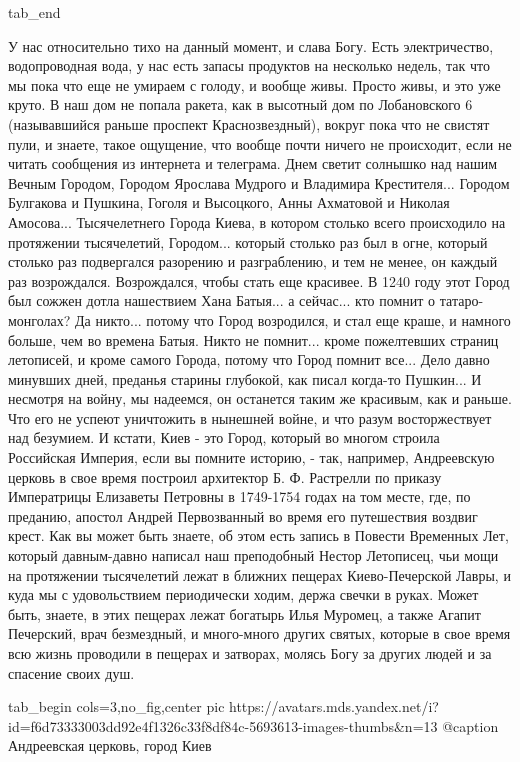   tab_end
\fi

У нас относительно тихо на данный момент,
и слава Богу. Есть электричество, водопроводная вода, у нас есть запасы
продуктов на несколько недель, так что мы пока что еще не умираем с голоду, и
вообще живы. Просто живы, и это уже круто.  В наш дом не попала ракета, как в
высотный дом по Лобановского 6 (называвшийся раньше проспект Краснозвездный),
вокруг пока что не свистят пули, и знаете, такое ощущение, что вообще почти
ничего не происходит, если не читать сообщения из интернета и телеграма.  Днем
светит солнышко над нашим Вечным Городом, Городом Ярослава Мудрого и Владимира
Крестителя... Городом Булгакова и Пушкина, Гоголя и Высоцкого, Анны Ахматовой и
Николая Амосова...  Тысячелетнего Города Киева, в котором столько всего
происходило на протяжении тысячелетий, Городом... который столько раз был в
огне, который столько раз подвергался разорению и разграблению, и тем не менее,
он каждый раз возрождался.  Возрождался, чтобы стать еще красивее. В 1240 году
этот Город был сожжен дотла нашествием Хана Батыя... а сейчас... кто помнит о
татаро-монголах?  Да никто...  потому что Город возродился, и стал еще краше, и
намного больше, чем во времена Батыя.  Никто не помнит... кроме пожелтевших
страниц летописей, и кроме самого Города, потому что Город помнит все... Дело
давно минувших дней, преданья старины глубокой, как писал когда-то Пушкин... И
несмотря на войну, мы надеемся, он останется таким же красивым, как и раньше.
Что его не успеют уничтожить в нынешней войне, и что разум восторжествует над
безумием.  И кстати, Киев - это Город, который во многом строила Российская
Империя, если вы помните историю, - так, например, Андреевскую церковь в свое
время построил архитектор Б. Ф.  Растрелли по приказу Императрицы Елизаветы
Петровны в 1749-1754 годах на том месте, где, по преданию, апостол Андрей
Первозванный во время его путешествия воздвиг крест. Как вы может быть знаете,
об этом есть запись в Повести Временных Лет, который давным-давно написал наш
преподобный Нестор Летописец, чьи мощи на протяжении тысячелетий лежат в
ближних пещерах Киево-Печерской Лавры, и куда мы с удовольствием периодически
ходим, держа свечки в руках.  Может быть, знаете, в этих пещерах лежат богатырь
Илья Муромец, а также Агапит Печерский, врач безмездный, и много-много других
святых, которые в свое время всю жизнь проводили в пещерах и затворах, молясь
Богу за других людей и за спасение своих душ.

\ifcmt
  tab_begin cols=3,no_fig,center
     pic https://avatars.mds.yandex.net/i?id=f6d73333003dd92e4f1326c33f8df84c-5693613-images-thumbs&n=13
		 @caption Андреевская церковь, город Киев

